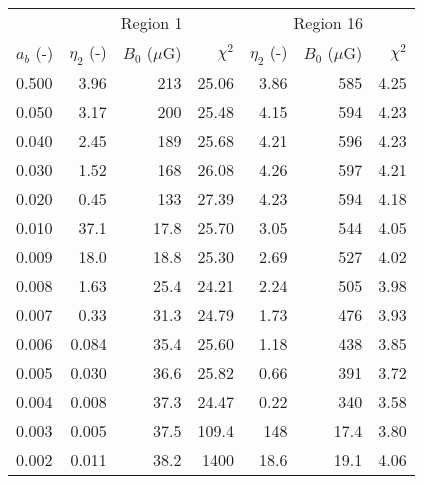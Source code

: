 \begin{tabular}{@{}lrrrrrr@{}}
\toprule
{} & \multicolumn{3}{c}{Region 1} & \multicolumn{3}{c}{Region 16}\\
\cmidrule(lr){2-4} \cmidrule(l){5-7}
$a_b$ (-) & $\eta_2$ (-) & $B_0$ ($\mu$G) & $\chi^2$
          & $\eta_2$ (-) & $B_0$ ($\mu$G) & $\chi^2$ \\
\midrule
0.500 &  3.96  & 213   & 25.06 & 3.86 & 585   & 4.25 \\
0.050 &  3.17  & 200   & 25.48 & 4.15 & 594   & 4.23 \\
0.040 &  2.45  & 189   & 25.68 & 4.21 & 596   & 4.23 \\
0.030 &  1.52  & 168   & 26.08 & 4.26 & 597   & 4.21 \\
0.020 &  0.45  & 133   & 27.39 & 4.23 & 594   & 4.18 \\
0.010 & 37.1   &  17.8 & 25.70 & 3.05 & 544   & 4.05 \\
0.009 & 18.0   &  18.8 & 25.30 & 2.69 & 527   & 4.02 \\
0.008 &  1.63  &  25.4 & 24.21 & 2.24 & 505   & 3.98 \\
0.007 &  0.33  &  31.3 & 24.79 & 1.73 & 476   & 3.93 \\
0.006 &  0.084 &  35.4 & 25.60 & 1.18 & 438   & 3.85 \\
0.005 &  0.030 &  36.6 & 25.82 & 0.66 & 391   & 3.72 \\
0.004 &  0.008 &  37.3 & 24.47 & 0.22 & 340   & 3.58 \\
0.003 &  0.005 &  37.5 & 109.4 & 148  &  17.4 & 3.80 \\
0.002 &  0.011 &  38.2 & 1400  & 18.6 &  19.1 & 4.06 \\
\bottomrule
\end{tabular}
